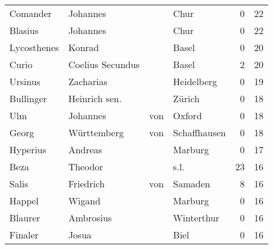 \documentclass[10pt,a4paper,landscape]{article}
\begin{document}
\begin{longtable}{llllrr}
                 Comander &                           Johannes &             &                                        Chur &          0 &        22 \\
                  Blasius &                           Johannes &             &                                        Chur &          0 &        22 \\
              Lycosthenes &                             Konrad &             &                                       Basel &          0 &        20 \\
                    Curio &                   Coelius Secundus &             &                                       Basel &          2 &        20 \\
                  Ursinus &                          Zacharias &             &                                  Heidelberg &          0 &        19 \\
                Bullinger &                      Heinrich sen. &             &                                      Zürich &          0 &        18 \\
                      Ulm &                           Johannes &         von &                                      Oxford &          0 &        18 \\
                    Georg &                        Württemberg &         von &                                Schaffhausen &          0 &        18 \\
                 Hyperius &                            Andreas &             &                                     Marburg &          0 &        17 \\
                     Beza &                            Theodor &             &                                        s.l. &         23 &        16 \\
                    Salis &                          Friedrich &         von &                                     Samaden &          8 &        16 \\
                   Happel &                             Wigand &             &                                     Marburg &          0 &        16 \\
                  Blaurer &                          Ambrosius &             &                                  Winterthur &          0 &        16 \\
                  Finaler &                              Josua &             &                                        Biel &          0 &        16 \\

\end{longtable}
\end{document}
